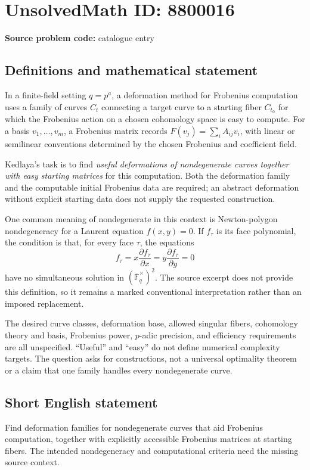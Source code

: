 \documentclass[11pt]{article}
\newcommand{\F}{\mathbb{F}}
\begin{document}
\section*{UnsolvedMath ID: 8800016}
\textbf{Source problem code:} catalogue entry
\subsection{Definitions and mathematical statement}
In a finite-field setting \(q=p^a\), a deformation method for Frobenius computation uses a family of curves \(C_t\) connecting a target curve to a starting fiber \(C_{t_0}\) for which the Frobenius action on a chosen cohomology space is easy to compute. For a basis \(v_1,\ldots,v_m\), a Frobenius matrix records \(F(v_j)=\sum_i A_{ij}v_i\), with linear or semilinear conventions determined by the chosen Frobenius and coefficient field.

Kedlaya's task is to find \emph{useful deformations of nondegenerate curves together with easy starting matrices} for this computation. Both the deformation family and the computable initial Frobenius data are required; an abstract deformation without explicit starting data does not supply the requested construction.

One common meaning of nondegenerate in this context is Newton-polygon nondegeneracy for a Laurent equation \(f(x,y)=0\). If \(f_\tau\) is its face polynomial, the condition is that, for every face \(\tau\), the equations
\[
 f_\tau=x\frac{\partial f_\tau}{\partial x}
 =y\frac{\partial f_\tau}{\partial y}=0
\]
have no simultaneous solution in \((\overline{\F}_q^{\times})^2\). The source excerpt does not provide this definition, so it remains a marked conventional interpretation rather than an imposed replacement.

The desired curve classes, deformation base, allowed singular fibers, cohomology theory and basis, Frobenius power, \(p\)-adic precision, and efficiency requirements are all unspecified. ``Useful'' and ``easy'' do not define numerical complexity targets. The question asks for constructions, not a universal optimality theorem or a claim that one family handles every nondegenerate curve.
\subsection{Short English statement}
Find deformation families for nondegenerate curves that aid Frobenius computation, together with explicitly accessible Frobenius matrices at starting fibers. The intended nondegeneracy and computational criteria need the missing source context.
\end{document}
